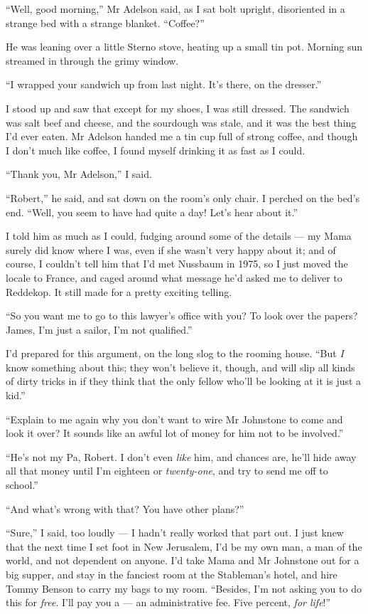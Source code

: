 \tb

``Well, good morning,'' Mr Adelson said, as I sat bolt upright,
disoriented in a strange bed with a strange blanket. ``Coffee?''

He was leaning over a little Sterno stove, heating up a small tin
pot. Morning sun streamed in through the grimy window.

``I wrapped your sandwich up from last night. It's there, on the dresser.''

I stood up and saw that except for my shoes, I was still dressed.
The sandwich was salt beef and cheese, and the sourdough was stale,
and it was the best thing I'd ever eaten. Mr Adelson handed me a
tin cup full of strong coffee, and though I don't much like coffee,
I found myself drinking it as fast as I could.

``Thank you, Mr Adelson,'' I said.

``Robert,'' he said, and sat down on the room's only chair. I
perched on the bed's end.
``Well, you seem to have had quite a day! Let's hear about it.''

I told him as much as I could, fudging around some of the details
--- my Mama surely did know where I was, even if she wasn't very
happy about it; and of course, I couldn't tell him that I'd met
Nussbaum in 1975, so I just moved the locale to France, and caged
around what message he'd asked me to deliver to Reddekop. It still
made for a pretty exciting telling.

``So you want me to go to this lawyer's office with you? To look over the 
papers? James, I'm just a sailor, I'm not qualified.''

I'd prepared for this argument, on the long slog to the rooming
house.
``But \emph{I} know something about this; they won't believe it, though, and 
will slip all kinds of dirty tricks in if they think that the only fellow 
who'll be looking at it is just a kid.''

``Explain to me again why you don't want to wire Mr Johnstone to come and look 
it over? It sounds like an awful lot of money for him not to be involved.''

``He's not my Pa, Robert. I don't even \emph{like} him, and chances are, he'll 
hide away all that money until I'm eighteen or \emph{twenty-one}, and try to 
send me off to school.''

``And what's wrong with that? You have other plans?''

``Sure,'' I said, too loudly --- I hadn't really worked that part
out. I just knew that the next time I set foot in New Jerusalem,
I'd be my own man, a man of the world, and not dependent on anyone.
I'd take Mama and Mr Johnstone out for a big supper, and stay in
the fanciest room at the Stableman's hotel, and hire Tommy Benson
to carry my bags to my room.
``Besides, I'm not asking you to do this for \emph{free}. I'll pay you a --- an 
administrative fee. Five percent, \emph{for life}!''


